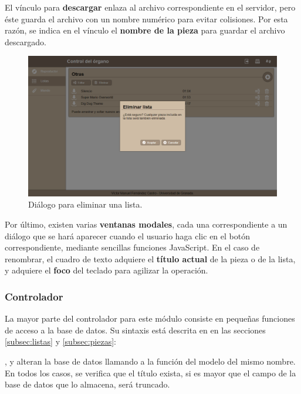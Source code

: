 El vínculo para \textbf{descargar} enlaza al archivo correspondiente en el servidor, pero éste guarda el archivo con un nombre numérico para evitar colisiones. Por esta razón, se indica en el vínculo el \textbf{nombre de la pieza} para guardar el archivo descargado.

\smallskip

\begin{figure}[H]
	\noindent \begin{centering}
		\includegraphics[width=\linewidth*3/4]{capitulo5/cap_elim_lista}
		\par\end{centering}
	\smallskip
	\caption{\label{fig:cap_elim_lista} Diálogo para eliminar una lista.}
\end{figure} 

\smallskip

Por último, existen varias \textbf{ventanas modales}, cada una correspondiente a un diálogo que se hará aparecer cuando el usuario haga clic en el botón correspondiente, mediante sencillas funciones JavaScript. En el caso de renombrar, el cuadro de texto adquiere el \textbf{título actual} de la pieza o de la lista, y adquiere el \textbf{foco} del teclado para agilizar la operación.

\subsubsection{Controlador}

La mayor parte del controlador para este módulo consiste en pequeñas funciones de acceso a la base de datos. Su sintaxis está descrita en en las secciones \ref{subsec:listas} y \ref{subsec:piezas}:

,  y  alteran la base de datos llamando a la función del modelo del mismo nombre. En todos los casos, se verifica que el título exista, si es mayor que el campo de la base de datos que lo almacena, será truncado.

